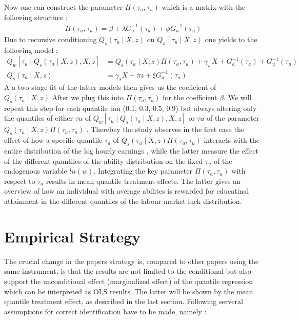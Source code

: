 \documentclass[12pt,a4paper]{article}
\begin{document}
Now one can construct the parameter \(\Pi(\tau_a,\tau_u)\) which is a
matrix with the following structure : \begin{align} \Pi\left(\tau_{a},
 \tau_{u}\right)=\beta+\lambda G_{a}^{-1}\left(\tau_{a}\right)+\phi
 G_{u}^{-1}\left(\tau_{u}\right)
 \end{align} Due to recursive conditioning
\(Q_{s}\left(\tau_{a}\mid X,z\right)\) on
\(Q_{w}\left[\tau_{u}\mid X,z\right)\) one yields to the following model
: \begin{align} Q_{w}\left[\tau_{u}
 \mid Q_s\left(\tau_{a} \mid X, z\right), X, z\right]&=Q_s\left(\tau_{a}
 \mid X, z\right) \Pi\left(\tau_{a}, \tau_{u}\right)+\gamma_{w}
 X+G_{a}^{-1}\left(\tau_{a}\right)+G_{u}^{-1}\left(\tau_{u}\right)&  \\
 Q_{s}\left(\tau_{a} \mid X, z\right)&=\gamma_{s} X+\pi z+\xi
 G_{a}^{-1}\left(\tau_{a}\right) & 
 \end{align} A a two stage fit of the latter models then gives us the
coeficient of \(Q_s\left(\tau_{a}\mid X, z\right)\) After we plug this
into \(\Pi\left(\tau_{a},\tau_{u}\right)\) for the coefficient
\(\beta\). We will repeat this step for each quantile tau (0.1, 0.3,
0.5, 0.9) but always altering only the quantiles of either \(\tau{u}\)
of
\(Q_{w}\left[\tau_{u}\mid Q_s\left(\tau_{a} \mid X, z\right), X, z\right]\)
or \(\tau{a}\) of the parameter
\(Q_s\left(\tau_{a}\mid X, z\right) \Pi\left(\tau_{a}, \tau_{u}\right)\)
. Therebey the study observes in the first case the effect of how a
specific quantile \(\tau_a\) of
\(Q_s\left(\tau_{a}\mid X, z\right)\Pi\left(\tau_{a},\tau_{u}\right)\)
interacts with the entire distribution of the log hourly earnings ,
while the latter measure the effect of the different quantiles of the
ability distribution on the fixed \(\tau_u\) of the endogenous variable
\(ln(w)\). Integrating the key parameter
\(\Pi\left(\tau_{a},\tau_{u}\right)\) with respect to \(\tau_a\) results
in mean quantile treatment effects. The latter gives an overview of how
an individual with average abilites is rewarded for educatinal
attainment in the different quantiles of the labour market luck
distribution.

\hypertarget{empirical-strategy}{%
\section{Empirical Strategy}\label{empirical-strategy}}

The crucial change in the papers strategy is, compared to other papers
using the same instrument, is that the results are not limited to the
conditional but also support the unconditional effect (marginalized
effect) of the quantile regression which can be interpreted as OLS
results. The latter will be shown by the mean quantile treatment effect,
as described in the last section. Following \textcite{brunello} serveral
assumptions for correct identification have to be made, namely :
\end{document}
